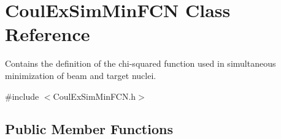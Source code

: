 \hypertarget{classCoulExSimMinFCN}{\section{Coul\-Ex\-Sim\-Min\-F\-C\-N Class Reference}
\label{classCoulExSimMinFCN}
}


Contains the definition of the chi-\/squared function used in simultaneous minimization of beam and target nuclei.  




{\ttfamily \#include $<$Coul\-Ex\-Sim\-Min\-F\-C\-N.\-h$>$}

\subsection*{Public Member Functions}
